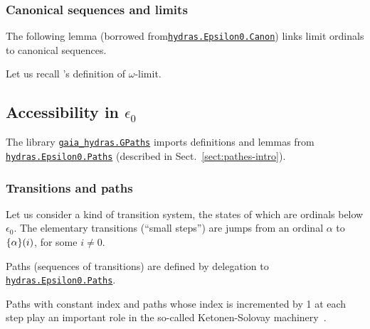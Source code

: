 \subsubsection{Canonical sequences and limits}

The following lemma (borrowed from\href{../theories/html/hydras.Epsilon0.Canon.html}%
{\texttt{hydras.Epsilon0.Canon}}) links limit ordinals to canonical sequences.


Let us recall \gaia's definition of $\omega$-limit.



\subsection{Accessibility in \texorpdfstring{$\epsilon_0$}{epsilon\_0}}
\label{sect:gpath}

The library \href{../theories/html/gaia_hydras.GPaths.html}%
{\texttt{gaia\_hydras.GPaths}} imports definitions and lemmas from
\href{../theories/html/hydras.Epsilon0.Paths.html}%
{\texttt{hydras.Epsilon0.Paths}} (described in Sect.~\ref{sect:pathes-intro}).


\subsubsection{Transitions and paths}
Let us consider a kind of transition system, the states of which are ordinals below $\epsilon_0$. The elementary transitions (``small steps'') are jumps from an ordinal $\alpha$ to $\mbox{$\{\alpha\}(i)$}$, for some $i\not=0$.


Paths (sequences of transitions) are defined by delegation to
\href{../theories/html/hydras.Epsilon0.Paths.html}%
{\texttt{hydras.Epsilon0.Paths}}.


 Paths with constant index and paths whose index is incremented by 1 at each step play an important role in the so-called Ketonen-Solovay machinery~\cite{KS81}.

